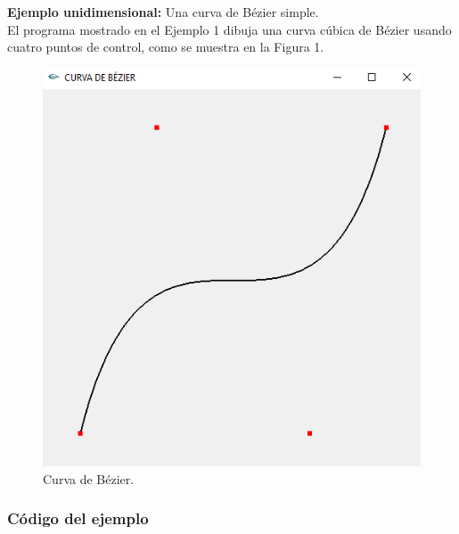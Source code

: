 \textbf{Ejemplo unidimensional:} Una curva de Bézier simple.\\

El programa mostrado en el Ejemplo 1 dibuja una curva cúbica de Bézier usando cuatro puntos de control, como se muestra en la Figura 1.

\begin{figure}[h!]
	\centering
	\includegraphics[width=0.5\linewidth]{../images/CURVA.PNG}
	\caption{Curva de Bézier.}
	\label{fig:propuesta}
\end{figure}
\subsubsection{Código del ejemplo}

